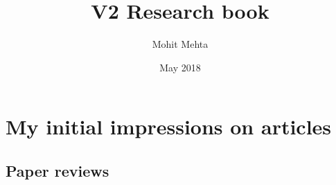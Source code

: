 \documentclass{article}
\title{V2 Research book}
\author{Mohit Mehta}
\date{May 2018}
\begin{document}
\maketitle

\section{My initial impressions on articles}
\subsection{Paper reviews}
\subsubsection{\cite{BryantsevChase2013}}


\newpage{}



\end{document}
